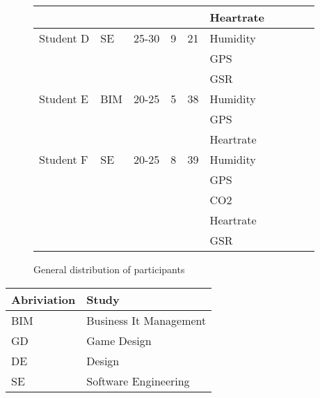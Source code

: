 \documentclass[conference]{IEEEtran}
\begin{document}
\begin{figure*}[ht]
\begin{tabular}{ | l | l | l | l | l | l | l | l | l | l | }
							& 				& 		& 		& 		& Heartrate	& 		& 				& 		& 		\\ \hline
			Student D		& SE 			& 25-30	& 9		& 21	& Humidity	& 		& 				& 		& 		\\ 
							& 				& 		& 		& 		& GPS		& 		& 				& 		& 		\\ 
							& 				& 		& 		& 		& GSR		& 		& 				& 		& 		\\ \hline
			Student E		& BIM		 	& 20-25	& 5 	& 38	& Humidity	& 		& 				& 		& 		\\ 
							& 				& 		& 		& 		& GPS		& 		& 				& 		& 		\\ 
							& 				& 		& 		& 		& Heartrate	& 		& 				& 		& 		\\ \hline
			Student F		& SE 			& 20-25	& 8		& 39	& Humidity	& 		& 				& 		& 		\\ 
							& 				& 		& 		& 		& GPS		& 		& 				& 		& 		\\ 
							& 				& 		& 		& 		& CO2		& 		& 				& 		& 		\\ 
							& 			 	& 		& 		& 		& Heartrate& 		& 				& 		& 		\\ 
							& 				& 		& 		& 		& GSR		& 		& 				& 		& 		\\ \hline
			\end{tabular}
			\caption{General distribution of participants}
		\end{figure*}
		\begin{tabular}{ | l | l | }
			\hline
			Abriviation & Study 					\\ \hline \hline
			BIM			& Business It Management	\\ \hline
			GD			& Game Design				\\ \hline
			DE			& Design					\\ \hline
			SE			& Software Engineering		\\ \hline
		
		\end{tabular}
\end{document}
